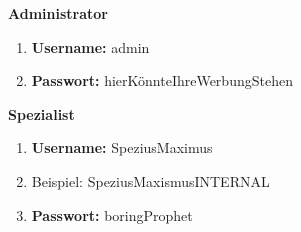 \textbf{Administrator}
\begin{enumerate}
	\item{\textbf{Username:} admin}
	\item{\textbf{Passwort:} hierKönnteIhreWerbungStehen}
\end{enumerate}
\pagebreak
\textbf{Spezialist}
\begin{enumerate}
	\item{\textbf{Username:} SpeziusMaximus}
	\item[]{Beispiel: SpeziusMaxismus\textunderscore{}INTERNAL}
	\item{\textbf{Passwort:} boringProphet}
\end{enumerate}

